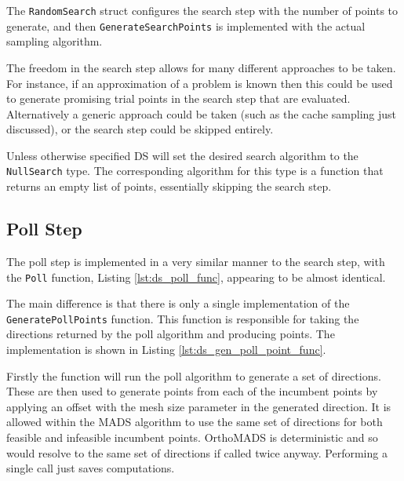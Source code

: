 The \texttt{RandomSearch} struct configures the search step with the number of points to generate, and then \texttt{GenerateSearchPoints} is implemented with the actual sampling algorithm.

The freedom in the search step allows for many different approaches to be taken. For instance, if an approximation of a problem is known then this could be used to generate promising trial points in the search step that are evaluated. Alternatively a generic approach could be taken (such as the cache sampling just discussed), or the search step could be skipped entirely.

Unless otherwise specified DS will set the desired search algorithm to the \texttt{NullSearch} type. The corresponding algorithm for this type is a function that returns an empty list of points, essentially skipping the search step.

\subsection{Poll Step}

The poll step is implemented in a very similar manner to the search step, with the \texttt{Poll} function, Listing \ref{lst:ds_poll_func}, appearing to be almost identical.

\begin{figure}[h]
    
\end{figure}

The main difference is that there is only a single implementation of the \texttt{GeneratePollPoints} function. This function is responsible for taking the directions returned by the poll algorithm and producing points. The implementation is shown in Listing \ref{lst:ds_gen_poll_point_func}.

\begin{figure}[h]
    
\end{figure}

Firstly the function will run the poll algorithm to generate a set of directions. These are then used to generate points from each of the incumbent points by applying an offset with the mesh size parameter in the generated direction. It is allowed within the MADS algorithm to use the same set of directions for both feasible and infeasible incumbent points. OrthoMADS is deterministic and so would resolve to the same set of directions if called twice anyway. Performing a single call just saves computations.


